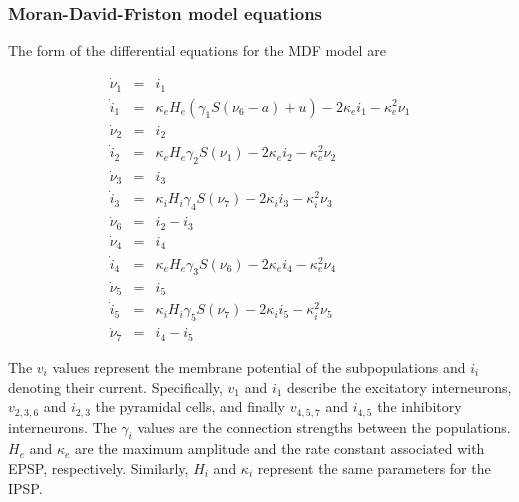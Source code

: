 \documentclass[12pt,twoside]{article}
\begin{document}
\subsubsection*{Moran-David-Friston model equations}

The form of the differential equations for the MDF model are

\begin{eqnarray}
    \dot{\nu}_{1} &=& i_{1}\\
    \dot{i}_{1} &=& \kappa_{e}H_{e}(\gamma_{1}S(\nu_{6}-a) + u) - 2\kappa_{e}i_{1} - \kappa_{e}^{2}\nu_{1}\\
    \dot{\nu}_{2} &=& i_{2}\\
    \dot{i}_{2} &=& \kappa_{e}H_{e}\gamma_{2}S(\nu_{1}) - 2\kappa_{e}i_{2} - \kappa_{e}^{2}\nu_{2}\\
    \dot{\nu}_{3} &=& i_{3}\\
    \dot{i}_{3} &=& \kappa_{i}H_{i}\gamma_{4}S(\nu_{7}) - 2\kappa_{i}i_{3} - \kappa_{i}^{2}\nu_{3}\\
    \dot{\nu}_{6} &=& i_{2} - i_{3}\\
    \dot{\nu}_{4} &=& i_{4}\\
    \dot{i}_{4} &=& \kappa_{e}H_{e}\gamma_{3}S(\nu_{6}) - 2\kappa_{e}i_{4} - \kappa_{e}^{2}\nu_{4}\\
    \dot{\nu}_{5} &=& i_{5}\\
    \dot{i}_{5} &=& \kappa_{i}H_{i}\gamma_{5}S(\nu_{7}) - 2\kappa_{i}i_{5} - \kappa_{i}^{2}\nu_{5} \\
    \dot{\nu}_{7} &=& i_{4} - i_{5}
\end{eqnarray}

The $v_i$ values represent the membrane potential of the subpopulations and $i_i$ denoting their current. Specifically, $v_1$ and $i_1$ describe the excitatory interneurons, $v_{2,3,6}$ and $i_{2,3}$ the pyramidal cells, and finally $v_{4,5,7}$ and $i_{4,5}$ the inhibitory interneurons. The $\gamma_i$ values are the connection strengths between the populations. $H_e$ and $\kappa_e$ are the maximum amplitude and the rate constant associated with EPSP, respectively. Similarly, $H_i$ and $\kappa_i$ represent the same parameters for the IPSP. 
\end{document}
